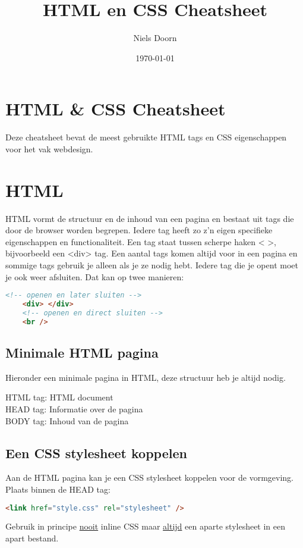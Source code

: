 \documentclass[8pt,pagesize,footinclude=false,headinclude=false]{scrartcl}
\title{HTML en CSS Cheatsheet}
\author{Niels Doorn}
\date{\today}
\begin{document}
\ifpdf
{}
\else
{}
\fi

\begin{multicols*}{4}

\section*{HTML \& CSS Cheatsheet}
Deze cheatsheet bevat de meest gebruikte HTML tags en CSS eigenschappen voor het vak webdesign.

\section*{HTML}
HTML vormt de structuur en de inhoud van een pagina en bestaat uit tags die door de browser worden begrepen. Iedere tag heeft zo z'n eigen specifieke eigenschappen en functionaliteit. Een tag staat tussen scherpe haken < >, bijvoorbeeld een <div> tag. Een aantal tags komen altijd voor in een pagina en sommige tags gebruik je alleen als je ze nodig hebt. Iedere tag die je opent moet je ook weer afsluiten. Dat kan op twee manieren:
\begin{lstlisting}[language=HTML]
	<!-- openen en later sluiten -->
	<div> </div>
	<!-- openen en direct sluiten -->
	<br />
\end{lstlisting}
\subsection*{Minimale HTML pagina}
Hieronder een minimale pagina in HTML, deze structuur heb je altijd nodig.

HTML tag: HTML document\\
HEAD tag: Informatie over de pagina\\
BODY tag: Inhoud van de pagina

\subsection*{Een CSS stylesheet koppelen}
Aan de HTML pagina kan je een CSS stylesheet koppelen voor de vormgeving.\\
\noindent Plaats binnen de HEAD tag:
\begin{lstlisting}[language=HTML]
	<link href="style.css" rel="stylesheet" />
\end{lstlisting}
\noindent Gebruik in principe \underline{nooit} inline CSS maar \underline{altijd} een aparte stylesheet in een apart bestand.


\end{multicols*}
\end{document}
